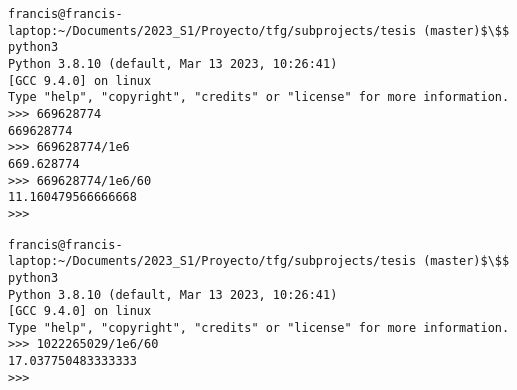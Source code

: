 \documentclass[12pt,oneside]{book}
\begin{document}
\begin{lstlisting}
francis@francis-laptop:~/Documents/2023_S1/Proyecto/tfg/subprojects/tesis (master)$\$$ python3
Python 3.8.10 (default, Mar 13 2023, 10:26:41) 
[GCC 9.4.0] on linux
Type "help", "copyright", "credits" or "license" for more information.
>>> 669628774
669628774
>>> 669628774/1e6
669.628774
>>> 669628774/1e6/60
11.160479566666668
>>> 
\end{lstlisting}

\begin{lstlisting}
francis@francis-laptop:~/Documents/2023_S1/Proyecto/tfg/subprojects/tesis (master)$\$$ python3
Python 3.8.10 (default, Mar 13 2023, 10:26:41) 
[GCC 9.4.0] on linux
Type "help", "copyright", "credits" or "license" for more information.
>>> 1022265029/1e6/60
17.037750483333333
>>> 
\end{lstlisting}
\end{document}
